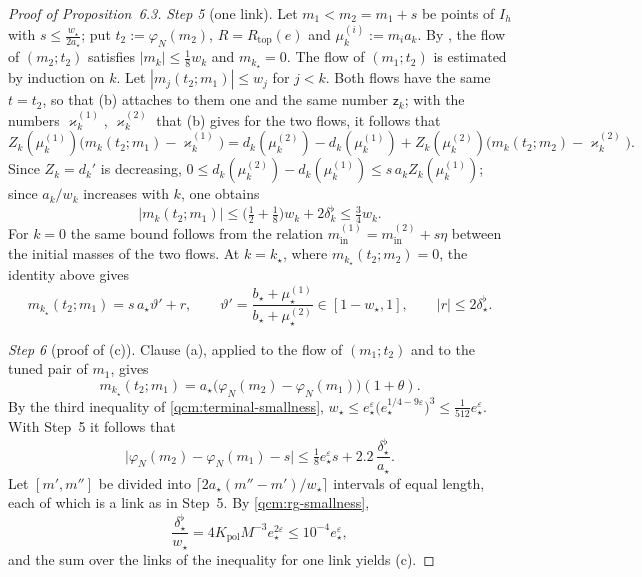 \documentclass[11pt,letterpaper,reqno]{amsart}
\theoremstyle{definition}
\begin{document}
\begin{proof}[Proof of Proposition~6.3]
\emph{Step 5} (one link).
Let $m_1<m_2=m_1+s$ be points of $I_h$ with $s\le\frac{w_\star}{2a_\star}$;
put $t_2:=\varphi_N(m_2)$, $R=R_{\mathrm{top}}(e)$ and $\mu_k^{(i)}:=m_ia_k$.
By \cite[Theorem~16.3]{QEDConstruction}, the flow of $(m_2;t_2)$ satisfies $|m_k|\le\frac18w_k$ and $m_{k_\star}=0$.
The flow of $(m_1;t_2)$ is estimated by induction on $k$.
Let $|m_j(t_2;m_1)|\le w_j$ for $j<k$.
Both flows have the same $t=t_2$, so that (b) attaches to them one and the same number $\mathsf z_k$;
with the numbers $\varkappa_k^{(1)}$, $\varkappa_k^{(2)}$ that (b) gives for the two flows, it follows that
\begin{equation*}
Z_k(\mu_k^{(1)})\bigl(m_k(t_2;m_1)-\varkappa_k^{(1)}\bigr)=d_k(\mu_k^{(2)})-d_k(\mu_k^{(1)})+Z_k(\mu_k^{(2)})\bigl(m_k(t_2;m_2)-\varkappa_k^{(2)}\bigr).
\end{equation*}
Since $Z_k=d_k'$ is decreasing, $0\le d_k(\mu_k^{(2)})-d_k(\mu_k^{(1)})\le s\,a_kZ_k(\mu_k^{(1)})$;
since $a_k/w_k$ increases with $k$, one obtains
\begin{equation*}
|m_k(t_2;m_1)|\le\bigl(\tfrac12+\tfrac18\bigr)w_k+2\delta_k^\flat\le\tfrac34w_k .
\end{equation*}
For $k=0$ the same bound follows from the relation $m^{(1)}_{\mathrm{in}}=m^{(2)}_{\mathrm{in}}+s\eta$ between the initial masses of the two flows.
At $k=k_\star$, where $m_{k_\star}(t_2;m_2)=0$, the identity above gives
\begin{equation*}
m_{k_\star}(t_2;m_1)=s\,a_\star\vartheta'+r,\qquad\vartheta'=\frac{b_\star+\mu_\star^{(1)}}{b_\star+\mu_\star^{(2)}}\in[1-w_\star,1],\qquad|r|\le2\delta^\flat_\star .
\end{equation*}

\emph{Step 6} (proof of (c)).
Clause (a), applied to the flow of $(m_1;t_2)$ and to the tuned pair of $m_1$, gives
\begin{equation*}
m_{k_\star}(t_2;m_1)=a_\star\bigl(\varphi_N(m_2)-\varphi_N(m_1)\bigr)(1+\theta).
\end{equation*}
By the third inequality of \eqref{qcm:terminal-smallness}, $w_\star\le e_\star^{\varepsilon}\bigl(e_\star^{1/4-9\varepsilon}\bigr)^3\le\frac1{512}e_\star^{\varepsilon}$.
With Step~5 it follows that
\begin{equation*}
\bigl|\varphi_N(m_2)-\varphi_N(m_1)-s\bigr|\le\tfrac18e_\star^{\varepsilon}s+2.2\,\frac{\delta^\flat_\star}{a_\star}.
\end{equation*}
Let $[m',m'']$ be divided into $\lceil2a_\star(m''-m')/w_\star\rceil$ intervals of equal length, each of which is a link as in Step~5.
By \eqref{qcm:rg-smallness},
\begin{equation*}
\frac{\delta^\flat_\star}{w_\star}=4K_{\mathrm{pol}}M^{-3}e_\star^{2\varepsilon}\le10^{-4}e_\star^{\varepsilon},
\end{equation*}
and the sum over the links of the inequality for one link yields (c).


\end{proof}
\end{document}
